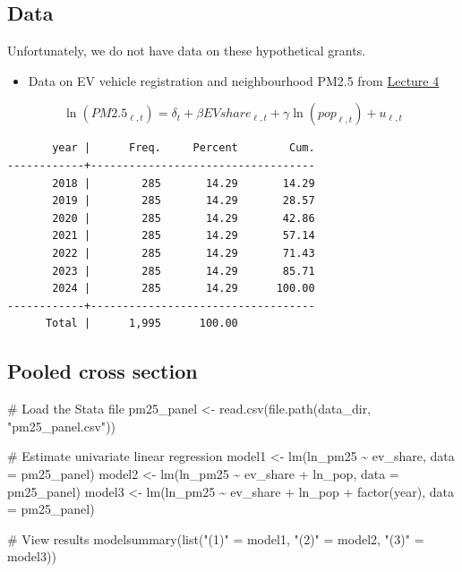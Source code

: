 \documentclass[
  letterpaper,
  DIV=11,
  numbers=noendperiod]{scrartcl}
\newenvironment{Shaded}{\begin{snugshade}}{\end{snugshade}}
\newcommand{\AttributeTok}[1]{\textcolor[rgb]{0.40,0.45,0.13}{#1}}
\newcommand{\CommentTok}[1]{\textcolor[rgb]{0.37,0.37,0.37}{#1}}
\newcommand{\FunctionTok}[1]{\textcolor[rgb]{0.28,0.35,0.67}{#1}}
\newcommand{\NormalTok}[1]{\textcolor[rgb]{0.00,0.23,0.31}{#1}}
\newcommand{\OtherTok}[1]{\textcolor[rgb]{0.00,0.23,0.31}{#1}}
\newcommand{\SpecialCharTok}[1]{\textcolor[rgb]{0.37,0.37,0.37}{#1}}
\newcommand{\StringTok}[1]{\textcolor[rgb]{0.13,0.47,0.30}{#1}}
\providecommand{\tightlist}{%
  \setlength{\itemsep}{0pt}\setlength{\parskip}{0pt}}
\begin{document}
\subsection{Data}\label{data}

Unfortunately, we do not have data on these hypothetical grants.

\begin{itemize}
\tightlist
\item
  Data on EV vehicle registration and neighbourhood PM2.5 from
  \href{lecture-4-multi.qmd}{Lecture 4}
\end{itemize}

\[
  \ln(PM2.5_{\ell,t}) = \delta_t + \beta EVshare_{\ell,t} + \gamma \ln(pop_{\ell,t}) + u_{\ell,t}
\]

\begin{verbatim}
       year |      Freq.     Percent        Cum.
------------+-----------------------------------
       2018 |        285       14.29       14.29
       2019 |        285       14.29       28.57
       2020 |        285       14.29       42.86
       2021 |        285       14.29       57.14
       2022 |        285       14.29       71.43
       2023 |        285       14.29       85.71
       2024 |        285       14.29      100.00
------------+-----------------------------------
      Total |      1,995      100.00
\end{verbatim}

\subsection{Pooled cross section}\label{pooled-cross-section}

\begin{Shaded}
\begin{Highlighting}[]
\CommentTok{\# Load the Stata file}
\NormalTok{pm25\_panel }\OtherTok{\textless{}{-}} \FunctionTok{read.csv}\NormalTok{(}\FunctionTok{file.path}\NormalTok{(data\_dir, }\StringTok{"pm25\_panel.csv"}\NormalTok{))}

\CommentTok{\# Estimate univariate linear regression}
\NormalTok{model1 }\OtherTok{\textless{}{-}} \FunctionTok{lm}\NormalTok{(ln\_pm25 }\SpecialCharTok{\textasciitilde{}}\NormalTok{ ev\_share, }\AttributeTok{data =}\NormalTok{ pm25\_panel)}
\NormalTok{model2 }\OtherTok{\textless{}{-}} \FunctionTok{lm}\NormalTok{(ln\_pm25 }\SpecialCharTok{\textasciitilde{}}\NormalTok{ ev\_share }\SpecialCharTok{+}\NormalTok{ ln\_pop, }\AttributeTok{data =}\NormalTok{ pm25\_panel)}
\NormalTok{model3 }\OtherTok{\textless{}{-}} \FunctionTok{lm}\NormalTok{(ln\_pm25 }\SpecialCharTok{\textasciitilde{}}\NormalTok{ ev\_share }\SpecialCharTok{+}\NormalTok{ ln\_pop }\SpecialCharTok{+} \FunctionTok{factor}\NormalTok{(year), }\AttributeTok{data =}\NormalTok{ pm25\_panel)}

\CommentTok{\# View results}
\FunctionTok{modelsummary}\NormalTok{(}\FunctionTok{list}\NormalTok{(}\StringTok{"(1)"} \OtherTok{=}\NormalTok{ model1, }\StringTok{"(2)"} \OtherTok{=}\NormalTok{ model2, }\StringTok{"(3)"} \OtherTok{=}\NormalTok{ model3))}
\end{Highlighting}
\end{Shaded}
\end{document}
